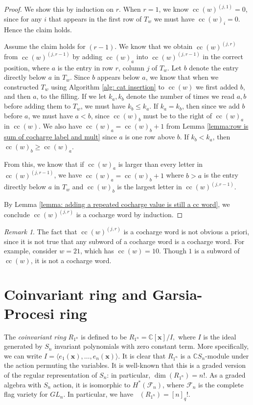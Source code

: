 \documentclass[10pt]{amsart}
\theoremstyle{plain}
\theoremstyle{definition}
\theoremstyle{plain}
\theoremstyle{plain}
\theoremstyle{remark}
\newtheorem{rema}[rema]{Remark}
\theoremstyle{plain}
\theoremstyle{plain}
\DeclareMathOperator{\Hilb}{Hilb}
\DeclareMathOperator{\cc}{cc}
\DeclareMathOperator{\Hilbq}{\Hilb_q}
\begin{document}
\begin{proof}
    We show this by induction on $r$. When $r=1$, we know $\cc(w)^{(j,1)} = 0$, since for any $i$ that appears in the first row of $T_w$ we must have $\cc(w)_i = 0$. Hence the claim holds.

    Assume the claim holds for $(r-1)$. We know that we obtain $\cc(w)^{(j,r)}$ from $\cc(w)^{(j,r-1)}$ by adding $\cc(w)_a$ into $\cc(w)^{(j,r-1)}$ in the correct position, where $a$ is the entry in row $r$, column $j$ of $T_w$.
    Let $b$ denote the entry directly below $a$ in $T_w$.
    Since $b$ appears below $a$, we know that when we constructed $T_w$ using Algorithm \ref{alg: cat insertion} to $\cc(w)$ we first added $b$, and then $a$, to the filling.
    If we let $k_a, k_b$ denote the number of times we read $a,b$ before adding them to $T_w$, we must have $k_b \leq  k_a$.
    If $k_a = k_b$, then since we add $b$ before $a$, we must have $a<b$, since $\cc(w)_b$ must be to the right of $\cc(w)_a$ in $\cc(w)$. We also have $\cc(w)_{a} = \cc(w)_{b} + 1$ from Lemma \ref{lemma:row is sum of cocharge label and mult} since $a$ is one row above $b$.  If $k_b < k_a$, then $\cc(w)_{b} \geq  \cc(w)_{a}$. 
    
    From this, we know that if $\cc(w)_a$ is larger than every letter in $\cc(w)^{(j,r-1)}$, we have $\cc(w)_a = \cc(w)_b+1$ where $b>a$ is the entry directly below $a$ in $T_w$ and $\cc(w)_b$ is the largest letter in $\cc(w)^{(j,r-1)}$.

     By Lemma \ref{lemma: adding a repeated cocharge value is still a cc word}, we conclude $\cc(w)^{(j,r)}$ is a cocharge word by induction.
\end{proof}

\begin{rema}
    The fact that $\cc(w)^{(j,r)}$ is a cocharge word is not obvious a priori, since it is not true that any subword of a cocharge word is a cocharge word. For example, consider $w = 21 $, which has $\cc(w) =10.$ Though $1$ is a subword of $\cc(w)$, it is not a cocharge word.
\end{rema}

\section{Coinvariant ring and Garsia-Procesi ring}\label{section: coinvariant ring and garsia procesi}

The \textit{coinvariant ring} $R_{1^n}$ is defined to be  $R_{1^n}= \mathbb{C}[\mathbf{x}]/ I,$ where $I$ is the ideal generated by $S_n$ invariant polynomials with zero constant term. More specifically, we can write $I = \langle e_1(\mathbf{x}),\dots, e_n(\mathbf{x})\rangle$.
It is clear that $R_{1^n}$ is a $\mathbb{C}S_n$-module under the action permuting the variables. 
It is well-known that this is a graded version of the regular representation of $S_n$: in particular, $\dim(R_{1^n}) = n!$. As a graded algebra with $S_n$ action, it is isomorphic to $H^{\ast}(\mathcal{F}_n)$, where $\mathcal{F}_n$ is the complete flag variety for $GL_n$. In particular, we have $\Hilbq(R_{1^n}) =[n]_q!$.
\end{document}
